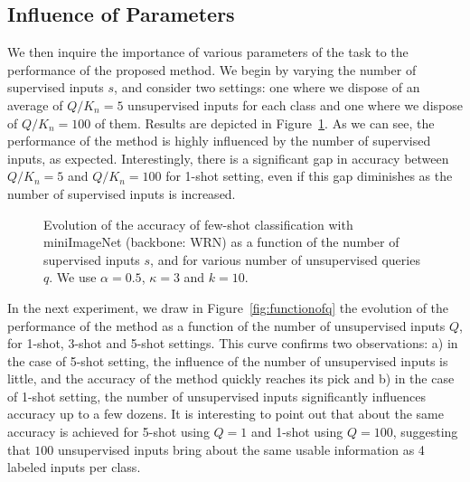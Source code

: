 \documentclass[a4paper,conference]{IEEEtran}
\begin{document}
\subsection{Influence of Parameters}

We then inquire the importance of various parameters of the task to the performance of the proposed method. We begin by varying the number of supervised inputs $s$, and consider two settings: one where we dispose of an average of $Q/K_n=5$ unsupervised inputs for each class and one where we dispose of $Q/K_n=100$ of them. Results are depicted in Figure~\ref{fig:functionofs}. As we can see, the performance of the method is highly influenced by the number of supervised inputs, as expected. Interestingly, there is a significant gap in accuracy between $Q/K_n=5$ and $Q/K_n=100$ for 1-shot setting, even if this gap diminishes as the number of supervised inputs is increased.

\begin{figure}[h]
  \begin{center}
  \end{center}
  \vspace{-.5cm}
  \caption{Evolution of the accuracy of few-shot classification with miniImageNet (backbone: WRN) as a function of the number of supervised inputs $s$, and for various number of unsupervised queries $q$. We use $\alpha=0.5$, $\kappa=3$ and $k=10$.}
  \label{fig:functionofs}
\end{figure}

In the next experiment, we draw in Figure~\ref{fig:functionofq} the evolution of the performance of the method as a function of the number of unsupervised inputs $Q$, for 1-shot, 3-shot and 5-shot settings. This curve confirms two observations: a) in the case of 5-shot setting, the influence of the number of unsupervised inputs is little, and the accuracy of the method quickly reaches its pick and b) in the case of 1-shot setting, the number of unsupervised inputs significantly influences accuracy up to a few dozens. It is interesting to point out that about the same accuracy is achieved for 5-shot using $Q=1$ and 1-shot using $Q=100$, suggesting that $100$ unsupervised inputs bring about the same usable information as 4 labeled inputs per class.
\end{document}
